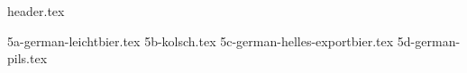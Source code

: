 \clearpage
{}
\divisorLine
{header.tex}
\begin{multicols*}{2}
{5a-german-leichtbier.tex}
{5b-kolsch.tex}
{5c-german-helles-exportbier.tex}
{5d-german-pils.tex}
\end{multicols*}